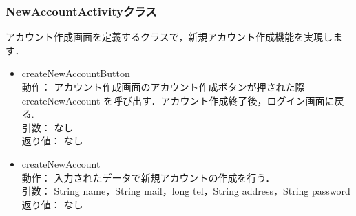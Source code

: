 \documentclass[a4j,titlepage]{jarticle}
\begin{document}
\subsubsection{NewAccountActivityクラス}
アカウント作成画面を定義するクラスで，新規アカウント作成機能を実現します．
\begin{itemize}
  \item createNewAccountButton\\
動作： アカウント作成画面のアカウント作成ボタンが押された際 createNewAccount を呼び出す．アカウント作成終了後，ログイン画面に戻る.\\
  引数： なし\\
  返り値： なし

 \item createNewAccount\\
  動作：  入力されたデータで新規アカウントの作成を行う．\\
  引数： String name，String mail，long tel，String address，String password\\
  返り値： なし
\end{itemize}
\end{document}
